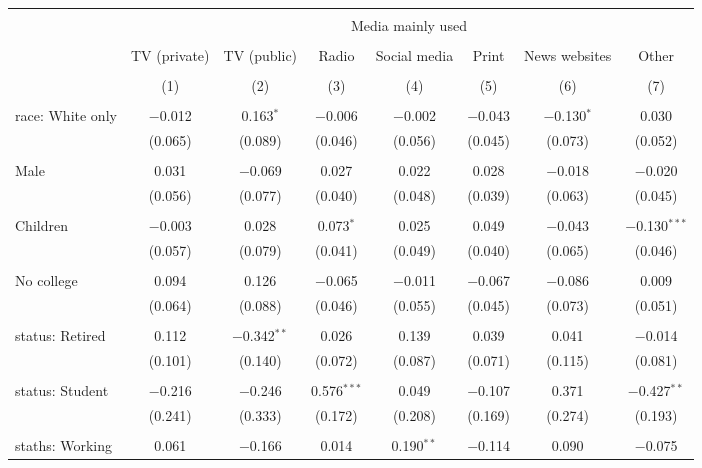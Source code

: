 
\begin{tabular}{@{\extracolsep{5pt}}lccccccc} 
\\[-1.8ex]\hline 
\hline \\[-1.8ex] 
 & \multicolumn{7}{c}{Media mainly used} \\ 
\cline{2-8} 
\\[-1.8ex] & TV (private) & TV (public) & Radio & Social media & Print & News websites & Other \\ 
\\[-1.8ex] & (1) & (2) & (3) & (4) & (5) & (6) & (7)\\ 
\hline \\[-1.8ex] 
 race: White only & $-$0.012 & 0.163$^{*}$ & $-$0.006 & $-$0.002 & $-$0.043 & $-$0.130$^{*}$ & 0.030 \\ 
  & (0.065) & (0.089) & (0.046) & (0.056) & (0.045) & (0.073) & (0.052) \\ 
  & & & & & & & \\ 
 Male & 0.031 & $-$0.069 & 0.027 & 0.022 & 0.028 & $-$0.018 & $-$0.020 \\ 
  & (0.056) & (0.077) & (0.040) & (0.048) & (0.039) & (0.063) & (0.045) \\ 
  & & & & & & & \\ 
 Children & $-$0.003 & 0.028 & 0.073$^{*}$ & 0.025 & 0.049 & $-$0.043 & $-$0.130$^{***}$ \\ 
  & (0.057) & (0.079) & (0.041) & (0.049) & (0.040) & (0.065) & (0.046) \\ 
  & & & & & & & \\ 
 No college & 0.094 & 0.126 & $-$0.065 & $-$0.011 & $-$0.067 & $-$0.086 & 0.009 \\ 
  & (0.064) & (0.088) & (0.046) & (0.055) & (0.045) & (0.073) & (0.051) \\ 
  & & & & & & & \\ 
 status: Retired & 0.112 & $-$0.342$^{**}$ & 0.026 & 0.139 & 0.039 & 0.041 & $-$0.014 \\ 
  & (0.101) & (0.140) & (0.072) & (0.087) & (0.071) & (0.115) & (0.081) \\ 
  & & & & & & & \\ 
 status: Student & $-$0.216 & $-$0.246 & 0.576$^{***}$ & 0.049 & $-$0.107 & 0.371 & $-$0.427$^{**}$ \\ 
  & (0.241) & (0.333) & (0.172) & (0.208) & (0.169) & (0.274) & (0.193) \\ 
  & & & & & & & \\ 
 staths: Working & 0.061 & $-$0.166 & 0.014 & 0.190$^{**}$ & $-$0.114 & 0.090 & $-$0.075 \\ 

\end{tabular}
